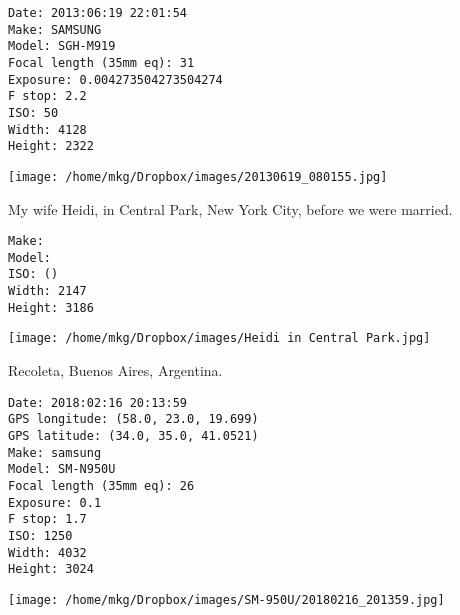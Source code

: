 \begin{lstlisting}
Date: 2013:06:19 22:01:54
Make: SAMSUNG
Model: SGH-M919
Focal length (35mm eq): 31
Exposure: 0.004273504273504274
F stop: 2.2
ISO: 50
Width: 4128
Height: 2322

\end{lstlisting}

\clearpage
\texttt{[image: /home/mkg/Dropbox/images/20130619\_080155.jpg]}

\clearpage

\noindent My wife Heidi, in Central Park, New York City, before we were married.

\begin{lstlisting}
Make: 
Model: 
ISO: ()
Width: 2147
Height: 3186

\end{lstlisting}

\clearpage
\texttt{[image: /home/mkg/Dropbox/images/Heidi in Central Park.jpg]}

\clearpage

\noindent Recoleta, Buenos Aires, Argentina.

\begin{lstlisting}
Date: 2018:02:16 20:13:59
GPS longitude: (58.0, 23.0, 19.699)
GPS latitude: (34.0, 35.0, 41.0521)
Make: samsung
Model: SM-N950U
Focal length (35mm eq): 26
Exposure: 0.1
F stop: 1.7
ISO: 1250
Width: 4032
Height: 3024

\end{lstlisting}

\clearpage
\texttt{[image: /home/mkg/Dropbox/images/SM-950U/20180216\_201359.jpg]}

